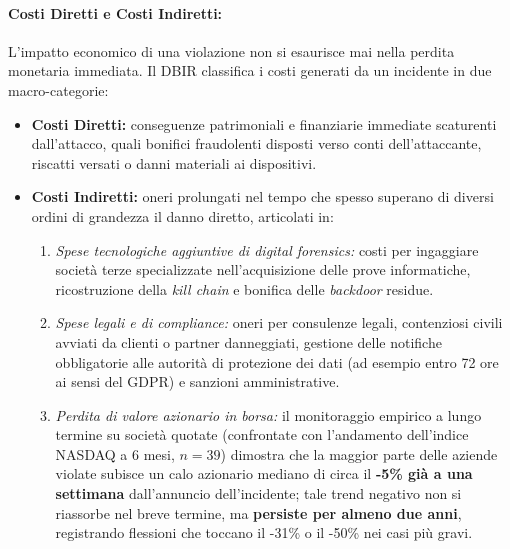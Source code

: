 \documentclass[../../main.tex]{subfiles}
\begin{document}
\paragraph{Costi Diretti e Costi Indiretti:}
L'impatto economico di una violazione non si esaurisce mai nella perdita monetaria immediata. Il DBIR classifica i costi generati da un incidente in due macro-categorie:
\begin{itemize}
    \item \textbf{Costi Diretti:} conseguenze patrimoniali e finanziarie immediate scaturenti dall'attacco, quali bonifici fraudolenti disposti verso conti dell'attaccante, riscatti versati o danni materiali ai dispositivi.
    \item \textbf{Costi Indiretti:} oneri prolungati nel tempo che spesso superano di diversi ordini di grandezza il danno diretto, articolati in:
    \begin{enumerate}
        \item \textit{Spese tecnologiche aggiuntive di digital forensics:} costi per ingaggiare società terze specializzate nell'acquisizione delle prove informatiche, ricostruzione della \textit{kill chain} e bonifica delle \textit{backdoor} residue.
        \item \textit{Spese legali e di compliance:} oneri per consulenze legali, contenziosi civili avviati da clienti o partner danneggiati, gestione delle notifiche obbligatorie alle autorità di protezione dei dati (ad esempio entro 72 ore ai sensi del GDPR) e sanzioni amministrative.
        \item \textit{Perdita di valore azionario in borsa:} il monitoraggio empirico a lungo termine su società quotate (confrontate con l'andamento dell'indice NASDAQ a 6 mesi, $n=39$) dimostra che la maggior parte delle aziende violate subisce un calo azionario mediano di circa il \textbf{-5\% già a una settimana} dall'annuncio dell'incidente; tale trend negativo non si riassorbe nel breve termine, ma \textbf{persiste per almeno due anni}, registrando flessioni che toccano il -31\% o il -50\% nei casi più gravi.
    \end{enumerate}
\end{itemize}
\end{document}
